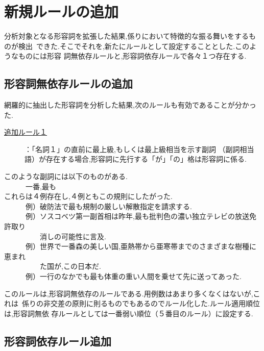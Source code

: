 \section{新規ルールの追加}

分析対象となる形容詞を拡張した結果,係りにおいて特徴的な振る舞いを\mbox{するものが検出
でき}た.そこでそれを,新たにルールとして設定することとした.このようなものには形容
詞無依存ルールと,形容詞依存ルールで各々１つ存在する.

\subsection{形容詞無依存ルールの追加}

網羅的に抽出した形容詞を分析した結果,次のルールも有効であることが分かった.
{\bf \begin{description}
\item[\underline{追加ルール１}]：「名詞１」の直前に最上級,もしくは最上級相当を示す副詞
  （副詞相当語）が存在する場合,形容詞に先行する「が」「の」格は形容詞に係る.
\end{description}}

このような副詞には以下のものがある.\\
　　　一番,最も\\
これらは４例存在し,４例ともこの規則にしたがった.\\
　　　例）破防法で最も規制の厳しい解散指定を請求する.\\
　　　例）ソスコベツ第一副首相は昨年,最も批判色の濃い独立テレビの放送免許取り\\
　　　　　消しの可能性に言及.\\
　　　例）世界で一番森の美しい国,亜熱帯から亜寒帯までのさまざまな樹種に恵まれ\\
　　　　　た国が,この日本だ.\\
　　　例）一行のなかでも最も体重の重い人間を乗せて先に送ってあった.

このルールは,形容詞無依存のルールである.用例数はあまり多くなくはないが,\mbox{これは
係りの}非交差の原則に則るものでもあるのでルール化した.ルール適用順位は,形容詞無依
存ルールとしては一番弱い順位（５番目のルール）に設定する.
    
\subsection{形容詞依存ルール追加}

